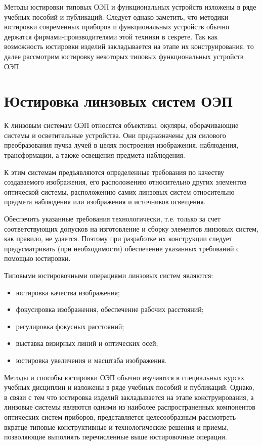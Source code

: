 Методы юстировки типовых ОЭП и функциональных устройств изложены в ряде учебных пособий и публикаций. Следует однако заметить, что методики юстировки современных приборов и функциональных устройств обычно держатся фирмами-производителями этой техники в секрете.
Так как возможность юстировки изделий закладывается на этапе их конструирования, то далее рассмотрим юстировку некоторых типовых функциональных устройств ОЭП.

\section{Юстировка линзовых систем ОЭП}

К линзовым системам ОЭП относятся объективы, окуляры, оборачивающие системы и осветительные устройства. Они предназначены для силового преобразования пучка лучей в целях построения изображения, наблюдения, трансформации, а также освещения предмета наблюдения.

К этим системам предъявляются определенные требования по качеству создаваемого изображения, его расположению относительно других элементов оптической системы, расположению самих линзовых систем относительно предмета наблюдения или изображения и источников освещения.

Обеспечить указанные требования технологически, т.е. только за счет соответствующих допусков на изготовление и сборку элементов линзовых систем, как правило, не удается. Поэтому при разработке их конструкции следует предусматривать (при необходимости) обеспечение указанных требований с помощью юстировки.

Типовыми юстировочными операциями линзовых систем являются:
\begin{itemize}
\item юстировка качества изображения;
\item фокусировка изображения, обеспечение рабочих расстояний;
\item регулировка фокусных расстояний;
\item выставка визирных линий и оптических осей;
\item юстировка увеличения и масштаба изображения.
\end{itemize}

Методы и способы юстировки ОЭП обычно изучаются в специальных курсах учебных дисциплин и изложены в ряде учебных пособий и публикаций. Однако, в связи с тем что юстировка изделий закладывается на этапе конструирования, а линзовые системы являются одними из наиболее распространенных компонентов оптических систем приборов, представляется целесообразным рассмотреть вкратце типовые конструктивные и технологические решения и приемы, позволяющие выполнять перечисленные выше юстировочные операции.

